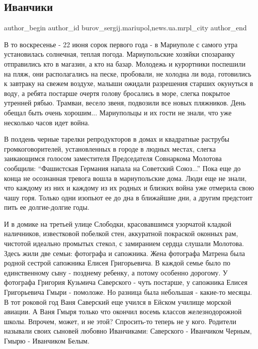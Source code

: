  
 
 
 
 
 
\subsection{Иванчики}
\label{sec:22_06_2017.stz.news.ua.mrpl_city.1.ivanchiki}
 
\ifcmt
 author_begin
   author_id burov_sergij.mariupol,news.ua.mrpl_city
 author_end
\fi


В то воскресенье - 22 июня сорок первого года - в Мариуполе с самого утра
установилась солнечная, теплая погода. Мариупольские хозяйки спозаранку
отправились кто в магазин, а кто на базар. Молодежь и курортники поспешили на
пляж, они располагались на песке, пробовали, не холодна ли вода, готовились к
завтраку на свежем воздухе, малыши ожидали разрешения старших окунуться в воду,
а ребята постарше очертя голову бросались в море, слегка покрытое утренней
рябью. Трамваи, весело звеня, подвозили все новых пляжников. День обещал быть
очень хорошим... Мариупольцы и их гости не знали, что уже несколько часов
идет война.

В полдень черные тарелки репродукторов в домах и квадратные раструбы
громкоговорителей, установленных в городе в людных местах, слегка заикающимся
голосом заместителя Председателя Совнаркома Молотова сообщили: \enquote{Фашистская
Германия напала на Советский Союз...} Пока еще до конца не осознанная тревога
вошла в мариупольские дома. Люди еще не знали, что каждому из них и каждому из
их родных и близких война уже отмерила свою чашу горя. Только одни изопьют ее
до дна в ближайшие дни, а другим предстоит пить ее долгие-долгие годы.


И в домике на третьей улице Слободки, красовавшимся узорчатой кладкой
наличников, известковой побелкой стен, аккуратной покраской оконных рам,
чистотой идеально промытых стекол, с замиранием сердца слушали Молотова. Здесь
жили две семьи: фотографа и сапожника. Жена фотографа Матрена была родной
сестрой сапожника Елисея Григорьевича. В каждой семье было по единственному
сыну - позднему ребенку, а потому особенно дорогому. У фотографа Григория
Кузьмича Саверского - чуть постарше, у сапожника Елисея Григорьевича Гмыри -
помоложе. Но разница была небольшая - какие-то месяцы. В тот роковой год Ваня
Саверский еще учился в Ейском училище морской авиации. А Ваня Гмыря только что
окончил восемь классов железнодорожной школы. Впрочем, может, и не этой?
Спросить-то теперь не у кого. Родители называли своих сыновей любовно
Иванчиками: Саверского - Иванчиком Черным, Гмырю - Иванчиком Белым.

